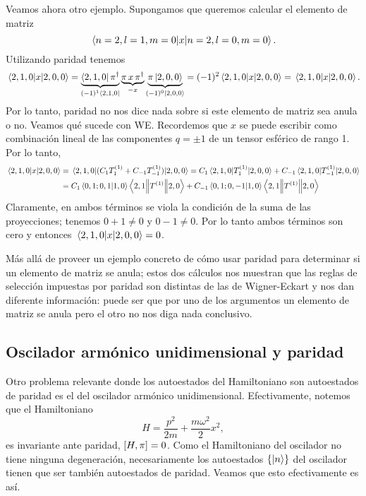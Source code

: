 \documentclass[10pt, a4paper]{article}
\numberwithin{equation}{subsection}
\begin{document}
Veamos ahora otro ejemplo. Supongamos que queremos calcular el elemento de
matriz
\begin{equation}
  \matrixel{n=2,l=1,m=0}{x}{n=2,l=0,m=0}.
\end{equation}
Utilizando paridad tenemos
\begin{equation}
  \matrixel{2,1,0}{x}{2,0,0}
  = \underbrace{\bra{2,1,0}\parityop^\dagger}_{(-1)^1\bra{2,1,0}}
    \underbrace{\parityop\,x\,\parityop^\dagger}_{-x}
    \underbrace{\parityop\ket{2,0,0}}_{(-1)^0\ket{2,0,0}}
  = (-1)^2 \matrixel{2,1,0}{x}{2,0,0}
  = \matrixel{2,1,0}{x}{2,0,0}.
\end{equation}
Por lo tanto, paridad no nos dice nada sobre si este elemento de matriz sea
anula o no.  Veamos qué sucede con WE. Recordemos que $x$ se puede escribir
como combinación lineal de las componentes $q = \pm1$ de un tensor esférico de
rango 1. Por lo tanto,
\begin{align}
  \matrixel{2,1,0}{x}{2,0,0}
  &= \matrixel{2,1,0}{(C_1T^{(1)}_{1} + C_{-1}T^{(1)}_{-1})}{2,0,0}
  = C_1\matrixel{2,1,0}{T^{(1)}_{1}}{2,0,0} +
    C_{-1}\matrixel{2,1,0}{T^{(1)}_{-1}}{2,0,0} \nonumber \\
  &= C_1\braket{0,1;0,1}{1,0} \doublebarmel{2,1}{T^{(1)}}{2,0} +
    C_{-1}\braket{0,1;0,-1}{1,0} \doublebarmel{2,1}{T^{(1)}}{2,0}
\end{align}
Claramente, en ambos términos se viola la condición de la suma de las
proyecciones; tenemos $0 + 1 \neq 0$ y $0 - 1 \neq 0$. Por lo tanto ambos
términos son cero y entonces $\matrixel{2,1,0}{x}{2,0,0} = 0$.

\bigbreak

Más allá de proveer un ejemplo concreto de cómo usar paridad para determinar si
un elemento de matriz se anula; estos dos cálculos nos muestran que las reglas
de selección impuestas por paridad son distintas de las de Wigner-Eckart y nos
dan diferente información: puede ser que por uno de los argumentos un
elemento de matriz se anula pero el otro no nos diga nada conclusivo.

\subsection{Oscilador armónico unidimensional y paridad}

Otro problema relevante donde los autoestados del Hamiltoniano son autoestados
de paridad es el del oscilador armónico unidimensional. Efectivamente, notemos
que el Hamiltoniano
\begin{equation}
  H = \frac{p^2}{2m} + \frac{m\omega^2}{2}x^2,
\end{equation}
es invariante ante paridad, $\comm{H}{\parityop} = 0$. Como el Hamiltoniano del
oscilador no tiene ninguna degeneración, necesariamente los autoestados
$\set{\ket{n}}$ del oscilador tienen que ser también autoestados de paridad.
Veamos que esto efectivamente es así.
\end{document}
